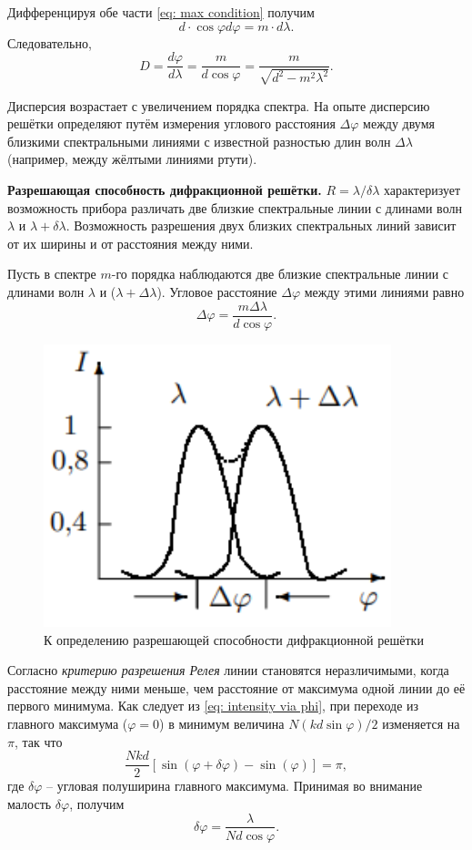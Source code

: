 \documentclass[a4paper,12pt]{article}
\begin{document}
Дифференцируя обе части \eqref{eq: max condition} получим
\[d \cdot \cos\varphi d\varphi = m \cdot d\lambda.\]
Следовательно, 
\[D = \frac{d\varphi}{d\lambda} = \frac{m}{d \cos\varphi} = \frac{m}{\sqrt{d^2 - m^2 \lambda^2}}.\]

Дисперсия возрастает с увеличением порядка спектра. На опыте дисперсию решётки определяют путём измерения углового расстояния $\Delta\varphi$
между двумя близкими спектральными линиями с известной разностью длин волн $\Delta\lambda$ (например, между жёлтыми линиями ртути).

\textbf{Разрешающая способность дифракционной решётки.} $R = \lambda / \delta\lambda$ характеризует возможность прибора различать две близкие спектральные линии с длинами волн $\lambda$ и $\lambda + \delta\lambda$. Возможность разрешения двух близких спектральных линий зависит от их ширины и от расстояния между ними. 

Пусть в спектре $m$-го порядка наблюдаются две близкие спектральные линии с длинами волн $\lambda$ и ($\lambda + \Delta\lambda$). Угловое расстояние
$\Delta\varphi$ между этими линиями равно
\[\Delta\varphi = \frac{m \Delta\lambda}{d\cos\varphi}.\]

\begin{figure}\label{fig: Rayleigh's criterion}
    \begin{center}
    \vspace{-20pt}
        \includegraphics[width = 0.9\textwidth]{Rayleigh's criterion.png}
    \end{center}
    \caption{К определению разрешающей способности дифракционной решётки}
\end{figure}
Согласно \textit{критерию разрешения Релея} линии становятся неразличимыми, когда расстояние между ними меньше, чем расстояние от максимума одной линии до её первого минимума. Как следует из \eqref{eq: intensity via phi}, при переходе из главного максимума ($\varphi = 0$) в минимум величина $ N(kd\sin\varphi) / 2$ изменяется на $\pi$, так что
\[\frac{Nkd}{2}[\sin(\varphi + \delta\varphi) - \sin(\varphi)] = \pi,\]
где $\delta\varphi$ -- угловая полуширина главного максимума. Принимая во внимание малость $\delta\varphi$, получим
\[\delta\varphi = \frac{\lambda}{Nd\cos\varphi}.\]
\end{document}

